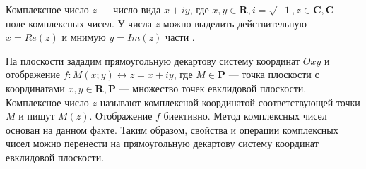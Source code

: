 Комплексное число \(z\) --- число вида $x + iy$, где $x,y \in \mathbf{R}, i = \sqrt{-1},z \in \mathbf{C},
   \mathbf{C}$ - поле комплексных чисел. У числа \(z\) можно выделить действительную $x = Re(z)$ и
мнимую $y=Im(z)$ части \cite[с. 357]{book:semendyaev}.

На плоскости зададим прямоугольную декартову систему координат \(Oxy\) и отображение $f: M(x;y)
   \leftrightarrow z = x + iy$, где $M \in \mathbf{P}$ --- точка плоскости с координатами $x,y \in
   \mathbf{R}, \mathbf{P}$ --- множество точек евклидовой плоскости. Комплексное число $z$ называют
комплексной координатой соответствующей точки $M$ и пишут \(M(z)\).
Отображение \(f\) биективно. Метод комплексных чисел основан на данном факте. Таким образом,
свойства и операции комплексных чисел можно перенести на прямоугольную декартову систему
координат евклидовой плоскости.

